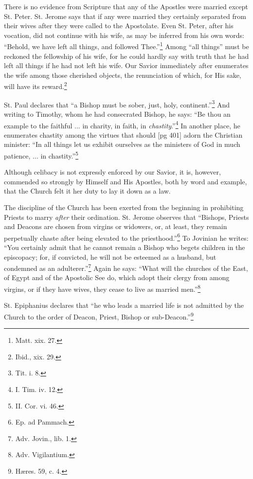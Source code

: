 There is no evidence from Scripture that any of
the Apostles were married except St. Peter. St.
Jerome says that if any were married they certainly
separated from their wives after they were
called to the Apostolate. Even St. Peter, after his
vocation, did not continue with his wife, as may
be inferred from his own words: “Behold, we
have left all things, and followed Thee.”\footnote{Matt.
xix. 27.} Among
“all things” must be reckoned the fellowship of
his wife, for he could hardly say with truth that
he had left all things if he had not left his wife.
Our Savior immediately after enumerates the wife
among those cherished objects, the renunciation of
which, for His sake, will have its reward.\footnote{Ibid., xix. 29.}

St. Paul declares that “a Bishop must be sober,
just, holy, continent.”\footnote{Tit. i. 8.} And writing to Timothy,
whom he had consecrated Bishop, he says: “Be
thou an example to the faithful ... in charity, in
faith, in \emph{chastity}.”\footnote{I.
Tim. iv. 12.} In another place, he enumerates
chastity among the virtues that should
[pg 401]
adorn the Christian minister: “In all things let us
exhibit ourselves as the ministers of God in much
patience, ... in chastity.”\footnote{II. Cor. vi. 46.}

Although celibacy is not expressly enforced by
our Savior, it is, however, commended so strongly
by Himself and His Apostles, both by word and
example, that the Church felt it her duty to lay it
down as a law.

The discipline of the Church has been exerted
from the beginning in prohibiting Priests to marry
\emph{after} their ordination. St. Jerome observes that
“Bishops, Priests and Deacons are chosen from
virgins or widowers, or, at least, they remain perpetually
chaste after being elevated to the priesthood.”\footnote{Ep.
ad Pammach.}
To Jovinian he writes: “You certainly
admit that he cannot remain a Bishop who begets
children in the episcopacy; for, if convicted, he will
not be esteemed as a husband, but condemned as
an adulterer.”\footnote{Adv. Jovin., lib.
1.} Again he says: “What will the
churches of the East, of Egypt and of the Apostolic
See do, which adopt their clergy from among
virgins, or if they have wives, they cease to live as
married men.”\footnote{Adv. Vigilantium.}

St. Epiphanius declares that “he who leads a
married life is not admitted by the Church to the
order of Deacon, Priest, Bishop or sub-Deacon.”\footnote{Hæres.
59, c. 4.}

